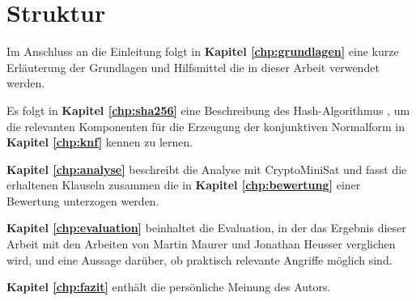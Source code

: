 \section{Struktur}

Im Anschluss an die Einleitung folgt in \textbf{Kapitel \ref{chp:grundlagen}} eine kurze
Erläuterung der Grundlagen und Hilfsmittel die in dieser Arbeit verwendet werden.

Es folgt in \textbf{Kapitel \ref{chp:sha256}} eine Beschreibung des Hash-Algorithmus , um die relevanten
Komponenten für die Erzeugung der konjunktiven Normalform in \textbf{Kapitel \ref{chp:knf}} kennen zu lernen.

\textbf{Kapitel \ref{chp:analyse}} beschreibt die Analyse mit CryptoMiniSat und fasst die erhaltenen Klauseln
zusammen die in \textbf{Kapitel \ref{chp:bewertung}} einer Bewertung unterzogen werden.

\textbf{Kapitel \ref{chp:evaluation}} beinhaltet die Evaluation, in der das Ergebnis dieser Arbeit mit den
Arbeiten von Martin Maurer und Jonathan Heusser verglichen wird, und eine Aussage darüber, ob praktisch
relevante Angriffe möglich sind.

\textbf{Kapitel \ref{chp:fazit}} enthält die persönliche Meinung des Autors.